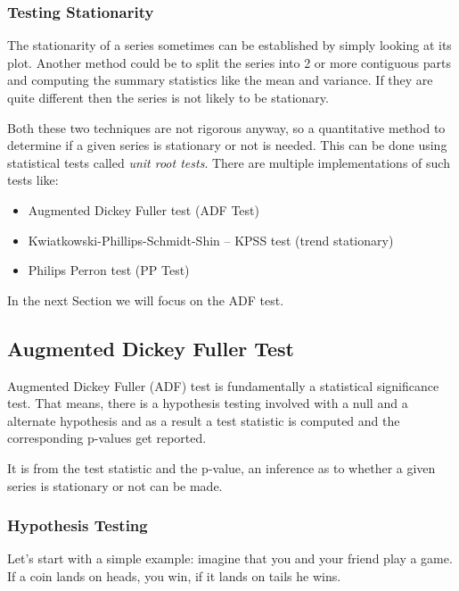 \documentclass[11pt]{article}
\providecommand{\tightlist}{%
      \setlength{\itemsep}{0pt}\setlength{\parskip}{0pt}}
\begin{document}
    \hypertarget{testing-stationarity}{%
\subsubsection{Testing Stationarity}\label{testing-stationarity}}

The stationarity of a series sometimes can be established by simply
looking at its plot. Another method could be to split the series into 2
or more contiguous parts and computing the summary statistics like the
mean and variance. If they are quite different then the series is not
likely to be stationary.

Both these two techniques are not rigorous anyway, so a quantitative
method to determine if a given series is stationary or not is needed.
This can be done using statistical tests called \emph{unit root tests}.
There are multiple implementations of such tests like:

\begin{itemize}
\tightlist
\item
  Augmented Dickey Fuller test (ADF Test)
\item
  Kwiatkowski-Phillips-Schmidt-Shin -- KPSS test (trend stationary)
\item
  Philips Perron test (PP Test)
\end{itemize}

In the next Section we will focus on the ADF test.

    \hypertarget{augmented-dickey-fuller-test}{%
\subsection{Augmented Dickey Fuller
Test}\label{augmented-dickey-fuller-test}}

Augmented Dickey Fuller (ADF) test is fundamentally a statistical
significance test. That means, there is a hypothesis testing involved
with a null and a alternate hypothesis and as a result a test statistic
is computed and the corresponding p-values get reported.

It is from the test statistic and the p-value, an inference as to
whether a given series is stationary or not can be made.

\hypertarget{hypothesis-testing}{%
\subsubsection{Hypothesis Testing}\label{hypothesis-testing}}

Let's start with a simple example: imagine that you and your friend play
a game. If a coin lands on heads, you win, if it lands on tails he wins.
\end{document}
